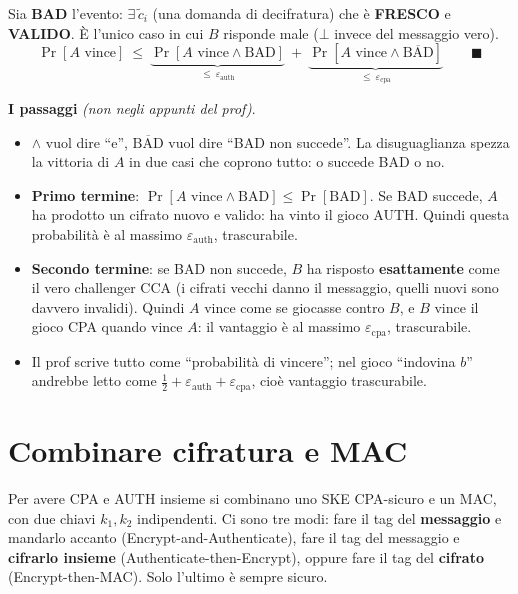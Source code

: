 Sia \textbf{BAD} l'evento: \(\exists\, \tilde{c}_i\) (una domanda di decifratura) che è \textbf{FRESCO} e \textbf{VALIDO}. È l'unico caso in cui \(B\) risponde male (\(\bot\) invece del messaggio vero).
\[
\Pr[A \text{ vince}] \ \le\ \underbrace{\Pr[A \text{ vince} \wedge \text{BAD}]}_{\le\ \varepsilon_{\text{auth}}} \ +\ \underbrace{\Pr[A \text{ vince} \wedge \overline{\text{BAD}}]}_{\le\ \varepsilon_{\text{cpa}}} \qquad \blacksquare
\]

\begin{nota}
\textbf{I passaggi} \emph{(non negli appunti del prof)}.
\begin{itemize}
  \item \(\wedge\) vuol dire ``e'', \(\overline{\text{BAD}}\) vuol dire ``BAD non succede''. La disuguaglianza spezza la vittoria di \(A\) in due casi che coprono tutto: o succede BAD o no.
  \item \textbf{Primo termine}: \(\Pr[A \text{ vince} \wedge \text{BAD}] \le \Pr[\text{BAD}]\). Se BAD succede, \(A\) ha prodotto un cifrato nuovo e valido: ha vinto il gioco AUTH. Quindi questa probabilità è al massimo \(\varepsilon_{\text{auth}}\), trascurabile.
  \item \textbf{Secondo termine}: se BAD non succede, \(B\) ha risposto \textbf{esattamente} come il vero challenger CCA (i cifrati vecchi danno il messaggio, quelli nuovi sono davvero invalidi). Quindi \(A\) vince come se giocasse contro \(B\), e \(B\) vince il gioco CPA quando vince \(A\): il vantaggio è al massimo \(\varepsilon_{\text{cpa}}\), trascurabile.
  \item Il prof scrive tutto come ``probabilità di vincere''; nel gioco ``indovina \(b\)'' andrebbe letto come \(\tfrac12 + \varepsilon_{\text{auth}} + \varepsilon_{\text{cpa}}\), cioè vantaggio trascurabile.
\end{itemize}
\end{nota}

\section{Combinare cifratura e MAC}

\begin{inbreve}
Per avere CPA e AUTH insieme si combinano uno SKE CPA-sicuro e un MAC, con due chiavi \(k_1, k_2\) indipendenti. Ci sono tre modi: fare il tag del \textbf{messaggio} e mandarlo accanto (Encrypt-and-Authenticate), fare il tag del messaggio e \textbf{cifrarlo insieme} (Authenticate-then-Encrypt), oppure fare il tag del \textbf{cifrato} (Encrypt-then-MAC). Solo l'ultimo è sempre sicuro.
\end{inbreve}


